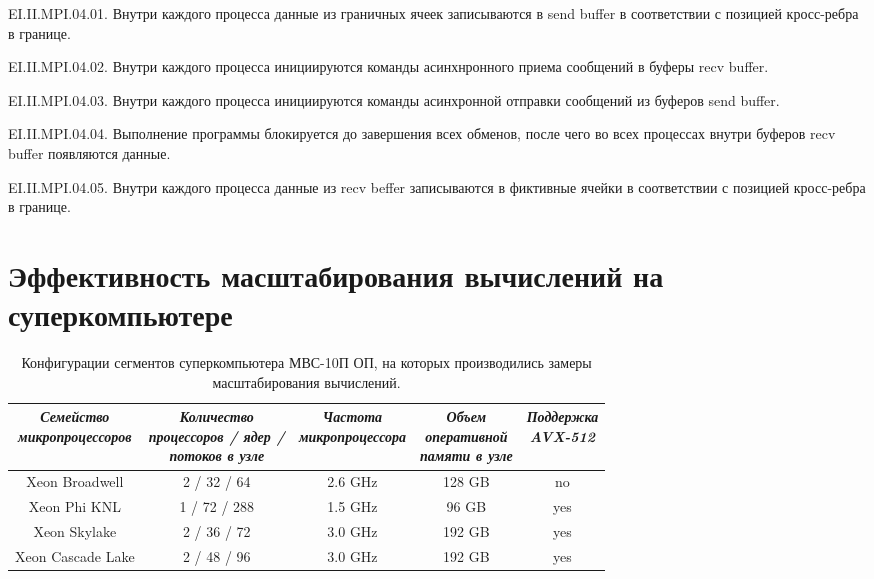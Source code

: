 \documentclass[
11pt,%
tightenlines,%
twoside,%
onecolumn,%
nofloats,%
nobibnotes,%
nofootinbib,%
superscriptaddress,%
noshowpacs,%
centertags]%
{revtex4}
\begin{document}
 EI.II.MPI.04.01. Внутри каждого процесса данные из граничных ячеек записываются в send buffer в соответствии с позицией кросс-ребра в границе.

 EI.II.MPI.04.02. Внутри каждого процесса инициируются команды асинхнронного приема сообщений в буферы recv buffer.

 EI.II.MPI.04.03. Внутри каждого процесса инициируются команды асинхронной отправки сообщений из буферов send buffer.

 EI.II.MPI.04.04. Выполнение программы блокируется до завершения всех обменов, после чего во всех процессах внутри буферов recv buffer появляются данные.

 EI.II.MPI.04.05. Внутри каждого процесса данные из recv beffer записываются в фиктивные ячейки в соответствии с позицией кросс-ребра в границе.

\section{Эффективность масштабирования вычислений на суперкомпьютере}

\begin{table}[!h]
\label{tbl:supercomputers}
\setcaptionmargin{0mm}
\onelinecaptionsfalse
{}
\caption{Конфигурации сегментов суперкомпьютера МВС-10П ОП, на которых производились замеры масштабирования вычислений.}
\bigskip
\begin{tabular}{|c|c|c|c|c|}
\hline
\parbox{3.5cm}{\textit{Семейство\\микропроцессоров}} & \parbox{4.0cm}{\textit{Количество\\процессоров / ядер /\\потоков в узле}} & \parbox{3.5cm}{\textit{Частота\\микропроцессора}} & \parbox{3.0cm}{\textit{Объем\\оперативной\\памяти в узле}} & \parbox{2.5cm}{\textit{Поддержка\\AVX-512}} \\
\hline
Xeon Broadwell & 2 / 32 / 64 & 2.6 GHz & 128 GB & no \\
\hline
Xeon Phi KNL & 1 / 72 / 288 & 1.5 GHz & 96 GB & yes \\
\hline
Xeon Skylake & 2 / 36 / 72 & 3.0 GHz & 192 GB & yes \\
\hline
Xeon Cascade Lake & 2 / 48 / 96 & 3.0 GHz & 192 GB & yes \\
\hline
\end{tabular}
\label{tab:supercomputers}
\end{table}   
\end{document}
